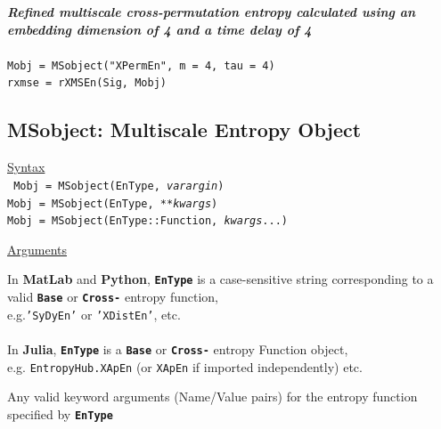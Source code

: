 \documentclass[12pt, a4paper, titlepage, openany]{book}
\begin{document}
\noindent \emph{\textbf{Refined multiscale cross-permutation entropy calculated using an embedding dimension of 4 and a time delay of 4}}
\\ \ \\ \indent \texttt{Mobj = MSobject("XPermEn", m = 4, tau = 4)\\
\indent rxmse = rXMSEn(Sig, Mobj)}




\newpage
\subsection{\normalsize MSobject: \hspace{15mm} Multiscale Entropy Object}
\noindent\ul{Syntax} \vspace{6mm} \\ \noindent \texttt{\footnotesize
Mobj = MSobject(EnType, \textit{varargin})\\
Mobj = MSobject(EnType, \textit{**kwargs})\\ 
Mobj = MSobject(EnType::Function, \textit{kwargs}...)}

\noindent \ul{Arguments}
\begin{description}[labelsep=2cm, labelwidth=5cm, nosep, style=multiline,leftmargin=4cm]\footnotesize
\item[\texttt{EnType}]		In \textbf{MatLab} and \textbf{Python}, \texttt{\textbf{EnType}} is a case-sensitive 							string corresponding to a valid \texttt{\textbf{Base}} or  \texttt{\textbf{Cross-}} entropy 							function, \\	e.g.\texttt{'SyDyEn'} or \texttt{'XDistEn'}, etc.\\ \ \\
							In \textbf{Julia}, \texttt{\textbf{EnType}} is a \texttt{\textbf{Base}} or  									\texttt{\textbf{Cross-}} entropy Function object,\\ e.g. \texttt{EntropyHub.XApEn} (or 									\texttt{XApEn} if imported independently) etc.\\
\item[\texttt{varargin\\ **kwargs\\kwargs...}] 		Any valid keyword arguments (Name/Value pairs) for the entropy function specified by \texttt{\textbf{EnType}}\\
\end{description}
\end{document}
